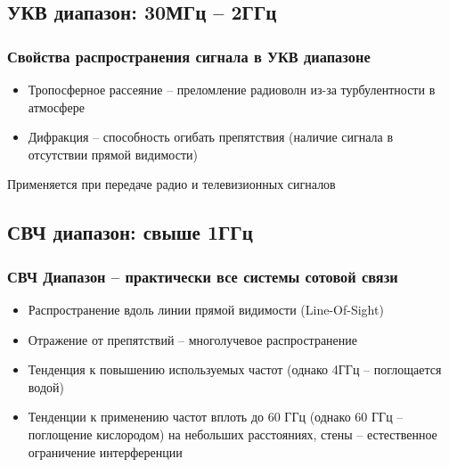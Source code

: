\documentclass[utf8]{beamer}
\begin{document}
\subsection{УКВ диапазон: 30МГц -- 2ГГц}
\begin{frame}
\frametitle{Свойства распространения сигнала в УКВ диапазоне}
\begin{itemize}
 \item Тропосферное рассеяние -- преломление радиоволн из-за турбулентности в атмосфере
 \item Дифракция -- способность огибать препятствия (наличие сигнала в отсутствии прямой видимости)
\end{itemize}
Применяется при передаче радио и телевизионных сигналов
\end{frame}
\subsection{СВЧ диапазон: свыше 1ГГц}
\begin{frame}
\frametitle{СВЧ Диапазон -- практически все системы сотовой связи}
\begin{itemize}
 \item Распространение вдоль линии прямой видимости (Line-Of-Sight)
 \item Отражение от препятствий -- многолучевое распространение
 \item Тенденция к повышению используемых частот (однако 4ГГц -- поглощается водой)
 \item Тенденции к применению частот вплоть до 60 ГГц (однако 60 ГГц -- поглощение кислородом) на небольших расстояниях, стены -- естественное ограничение интерференции
\end{itemize}
\end{frame}
\end{document}
